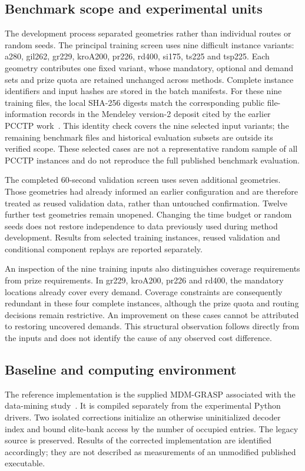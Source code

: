\subsection{Benchmark scope and experimental units}
The development process separated geometries rather than individual routes or
random seeds. The principal training screen uses nine difficult instance
variants: a280, gil262, gr229, kroA200, pr226, rd400, si175, ts225 and tsp225.
Each geometry contributes one fixed variant, whose mandatory, optional and
demand sets and prize quota are retained unchanged across methods. Complete
instance identifiers and input hashes are stored in the batch manifests.
For these nine training files, the local SHA-256 digests match the corresponding
public file-information records in the Mendeley version-2 deposit cited by
the earlier PCCTP work~\cite{climaco2021data}. This identity check covers the
nine selected input variants; the remaining benchmark files and historical
evaluation subsets are outside its verified scope.
These selected cases are not a representative random sample of all PCCTP
instances and do not reproduce the full published benchmark evaluation.

The completed 60-second validation screen uses seven additional geometries.
Those geometries had already informed an earlier configuration and are
therefore treated as reused validation data, rather than untouched
confirmation. Twelve further test geometries remain unopened. Changing the
time budget or random seeds does not restore independence to data previously
used during method development. Results from selected training instances,
reused validation and conditional component replays are reported separately.

An inspection of the nine training inputs also distinguishes coverage
requirements from prize requirements. In gr229, kroA200, pr226 and rd400, the
mandatory locations already cover every demand. Coverage constraints are
consequently redundant in these four complete instances, although the prize
quota and routing decisions remain restrictive. An improvement on these
cases cannot be attributed to restoring uncovered demands. This structural
observation follows directly from the inputs and does not identify the cause
of any observed cost difference.

\subsection{Baseline and computing environment}
The reference implementation is the supplied MDM-GRASP associated with
the data-mining study~\cite{climaco2026mdm}. It is compiled separately from
the experimental Python drivers. Two isolated corrections initialize an
otherwise uninitialized decoder index and bound elite-bank access by the
number of occupied entries. The legacy source is preserved. Results of the
corrected implementation are identified accordingly; they are not described
as measurements of an unmodified published executable.


